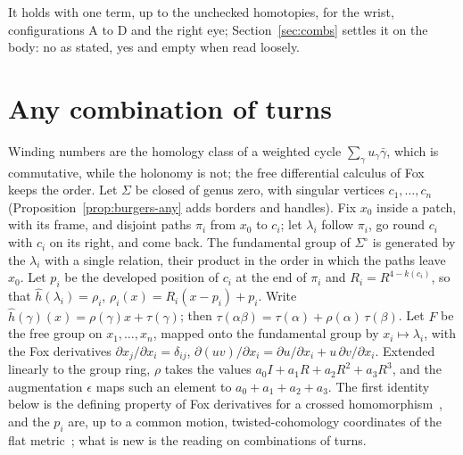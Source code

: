 \documentclass[11pt,a4paper]{article}
\begin{document}
It holds with one term, up to the unchecked homotopies, for the wrist,
configurations A to D and the right eye; Section~\ref{sec:combs} settles it on
the body: no as stated, yes and empty when read loosely.

\section{Any combination of turns}\label{sec:fox}

Winding numbers are the homology class of a weighted cycle $\sum_\gamma
u_\gamma \bar\gamma$, which is commutative, while the holonomy is not; the
free differential calculus of Fox~\cite{fox1953free} keeps the order. Let
$\Sigma$ be closed of genus zero, with singular vertices $c_1, \dots, c_n$
(Proposition~\ref{prop:burgers-any} adds borders and handles). Fix $x_0$ inside
a patch, with its frame, and disjoint paths $\pi_i$ from $x_0$ to $c_i$; let
$\lambda_i$ follow $\pi_i$, go round $c_i$ with $c_i$ on its right, and come
back. The fundamental group of $\Sigma^\circ$ is generated by the $\lambda_i$
with a single relation, their product in the order in which the paths leave
$x_0$. Let $p_i$ be the developed position of $c_i$ at the end of $\pi_i$ and
$R_i = R^{4 - k(c_i)}$, so that $\hat h(\lambda_i) = \rho_i$, $\rho_i(x) =
R_i(x - p_i) + p_i$. Write $\hat h(\gamma)(x) = \rho(\gamma)x + \tau(\gamma)$;
then $\tau(\alpha\beta) = \tau(\alpha) + \rho(\alpha)\,\tau(\beta)$. Let $F$
be the free group on $x_1, \dots, x_n$, mapped onto the fundamental group by
$x_i \mapsto \lambda_i$, with the Fox derivatives $\partial x_j/\partial x_i =
\delta_{ij}$, $\partial(uv)/\partial x_i = \partial u/\partial x_i +
u\,\partial v/\partial x_i$. Extended linearly to the group ring, $\rho$ takes
the values $a_0 I + a_1 R + a_2 R^2 + a_3 R^3$, and the augmentation $\epsilon$
maps such an element to $a_0 + a_1 + a_2 + a_3$. The first identity below is
the defining property of Fox derivatives for a crossed
homomorphism~\cite{fox1953free}, and the $p_i$ are, up to a common motion,
twisted-cohomology coordinates of the flat
metric~\cite{thurston1998shapes,veech1993flat}; what is new is the reading on
combinations of turns.
\end{document}
